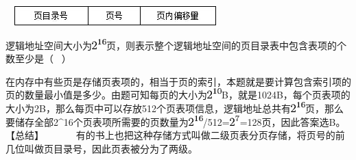 ~
\includegraphics[width=3.08333in,height=0.31250in]{computerassets/caeb37c4933000ccb425f21fe0f14b7d.jpeg}~

逻辑地址空间大小为\includegraphics[width=0.21875in,height=0.15625in]{texmath/0180d65Cdpi7B3507D25E7B167D}页，则表示整个逻辑地址空间的页目录表中包含表项的个数至少是（
~）
\par{}
\begin{solution}在内存中有些页是存储页表项的，相当于页的索引，本题就是要计算包含索引项的页的数量最小值是多少。由题可知每页的大小为\includegraphics[width=0.21875in,height=0.15625in]{texmath/e0c3285Cdpi7B3507D25E7B107D}B，就是1024B，每个页表项的大小为2B，那么每页中可以存放512个页表项信息，逻辑地址总共有\includegraphics[width=0.21875in,height=0.15625in]{texmath/0180d65Cdpi7B3507D25E7B167D}页，那么要储存全部2\^{}16个页表项所需要的页数量为\includegraphics[width=0.21875in,height=0.15625in]{texmath/0180d65Cdpi7B3507D25E7B167D}/512=\includegraphics[width=0.15625in,height=0.15625in]{texmath/9558dc5Cdpi7B3507D25E7B77D}=128页，因此答案选B。
【总结】 ~ ~ ~
~有的书上也把这种存储方式叫做二级页表分页存储，将页号的前几位叫做页目录号，因此页表被分为了两级。
\end{solution}
